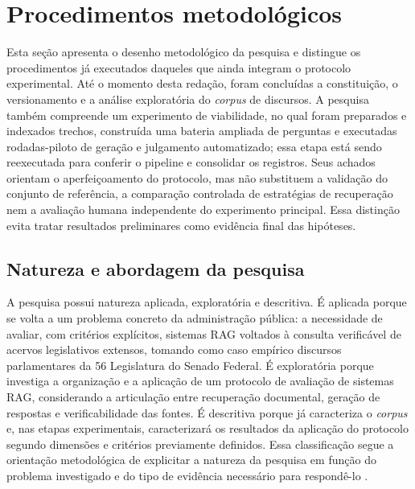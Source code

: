 \section{Procedimentos metodológicos}\label{sec:metodologia}

Esta seção apresenta o desenho metodológico da pesquisa e distingue os procedimentos já executados daqueles que ainda
integram o protocolo experimental. Até o momento desta redação, foram concluídas a constituição, o versionamento e a
análise exploratória do \textit{corpus} de discursos. A pesquisa também compreende um experimento de viabilidade, no qual
foram preparados e indexados trechos, construída uma bateria ampliada de perguntas e executadas rodadas-piloto de geração e
julgamento automatizado; essa etapa está sendo reexecutada para conferir o pipeline e consolidar os registros. Seus achados
orientam o aperfeiçoamento do protocolo, mas não substituem a validação do conjunto de referência, a comparação controlada de
estratégias de recuperação nem a avaliação humana independente do experimento principal. Essa distinção evita tratar resultados
preliminares como evidência final das hipóteses.

\subsection{Natureza e abordagem da pesquisa}

A pesquisa possui natureza aplicada, exploratória e descritiva. É aplicada porque se volta a um problema concreto da administração pública: a necessidade de avaliar, com critérios explícitos, sistemas RAG voltados à consulta verificável de acervos legislativos extensos, tomando como caso empírico discursos parlamentares da 56\textordfeminine{} Legislatura do Senado Federal. É exploratória porque investiga a organização e a aplicação de um protocolo de avaliação de sistemas RAG, considerando a articulação entre recuperação documental, geração de respostas e verificabilidade das fontes. É descritiva porque já caracteriza o \textit{corpus} e, nas etapas experimentais, caracterizará os resultados da aplicação do protocolo segundo dimensões e critérios previamente definidos. Essa classificação segue a orientação metodológica de explicitar a natureza da pesquisa em função do problema investigado e do tipo de evidência necessário para respondê-lo \parencite{gil2022projetosPesquisa}.

